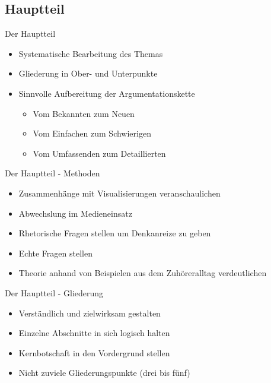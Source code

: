 \subsection{Hauptteil}
\begin{frame}{Der Hauptteil}
    \begin{itemize}[<+->]
        \item Systematische Bearbeitung des Themas
        \item Gliederung in Ober- und Unterpunkte
        \item Sinnvolle Aufbereitung der Argumentationskette 
           \begin{itemize}[<+->]
                \item Vom Bekannten zum Neuen
                \item Vom Einfachen zum Schwierigen
                \item Vom Umfassenden zum Detaillierten
           \end{itemize}
    \end{itemize}
\end{frame}

\begin{frame}{Der Hauptteil - Methoden}
    \begin{itemize}[<+->]
        \item Zusammenhänge mit Visualisierungen veranschaulichen
        \item Abwechslung im Medieneinsatz
        \item Rhetorische Fragen stellen um Denkanreize zu geben 
        \item Echte Fragen stellen
        \item Theorie anhand von Beispielen aus dem Zuhöreralltag verdeutlichen
    \end{itemize}
\end{frame}

\begin{frame}{Der Hauptteil - Gliederung}
    \begin{itemize}[<+->]
        \item Verständlich und zielwirksam gestalten
        \item Einzelne Abschnitte in sich logisch halten
        \item Kernbotschaft in den Vordergrund stellen
        \item Nicht zuviele Gliederungspunkte (drei bis fünf)
    \end{itemize}
\end{frame}

